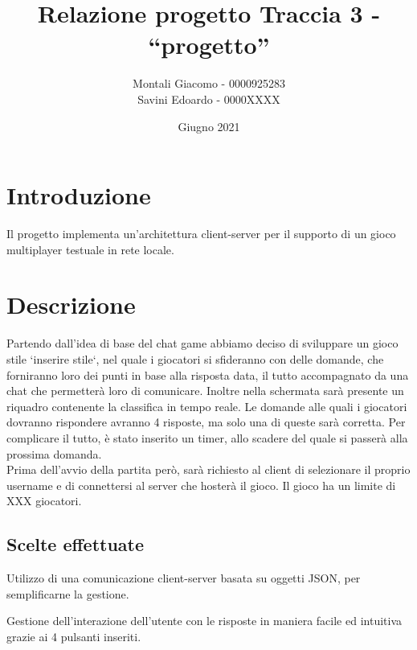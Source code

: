 \documentclass[a4paper,12pt]{report}
\title{\textbf{Relazione progetto} \break Traccia 3 - ``progetto''}
\author{Montali Giacomo - 0000925283 \\ Savini Edoardo - 0000XXXX}
\date{Giugno 2021}
\begin{document}
	\maketitle
	{\fontsize{14}{20}\selectfont
		\chapter{Introduzione}
			Il progetto implementa un’architettura client-server per il supporto di un gioco multiplayer testuale in rete locale.
			
		\chapter{Descrizione}
			Partendo dall'idea di base del chat game abbiamo deciso di sviluppare un gioco stile `inserire stile`, nel quale i giocatori si sfideranno con delle domande, che forniranno loro dei punti in base alla risposta data, il tutto accompagnato da una chat che permetterà loro di comunicare.
			Inoltre nella schermata sarà presente un riquadro contenente la classifica in tempo reale. 
			Le domande alle quali i giocatori dovranno rispondere avranno 4 risposte, ma solo una di queste sarà corretta. Per complicare il tutto, è stato inserito un timer, allo scadere del quale si passerà alla prossima domanda. \\
			Prima dell'avvio della partita però, sarà richiesto al client di selezionare il proprio username e di connettersi al server che hosterà il gioco.
			Il gioco ha un limite di XXX giocatori.
			
			\section{Scelte effettuate}
				\begin{description}[font=$\bullet$~\normalfont\scshape\color{red!90!black}]
					\item Utilizzo di una comunicazione client-server basata su oggetti JSON,
					per semplificarne la gestione.
					
					\item Gestione dell'interazione dell'utente con le risposte in maniera facile ed intuitiva grazie ai 4 pulsanti inseriti.
					
					\item 
					
					\item
				\end{description}
		
}
\end{document}
